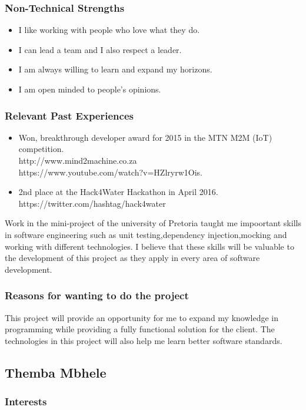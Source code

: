 \documentclass[a4paper,12pt]{article}
\begin{document}
\subsubsection{Non-Technical Strengths}
\begin{itemize}
\item I like working with people who love what they do.
\item I can lead a team and I also respect a leader.
\item I am always willing to learn and expand my horizons.
\item I am open minded to people's opinions.
\end{itemize}
\subsubsection{Relevant Past Experiences}
\begin{itemize}
\item Won, breakthrough developer award for 2015 in the MTN M2M (IoT) competition.\\
http://www.mind2machine.co.za \\
https://www.youtube.com/watch?v=HZlryrw1Ois.
\item 2nd place at the Hack4Water Hackathon in April 2016.\\
https://twitter.com/hashtag/hack4water
\end{itemize}
Work in the mini-project of the university of Pretoria taught me impoortant skills in software engineering such as unit testing,dependency injection,mocking and working with different technologies. I believe that these skills will be valuable to the development of this project as they apply in every area of software development.
\subsubsection{Reasons for wanting to do the project}
This project will provide an opportunity for me to expand my knowledge in programming while providing a fully functional solution for the client. The technologies in this project will also help me learn better software standards.
\subsection{Themba Mbhele}
\subsubsection{Interests}
\end{document}
